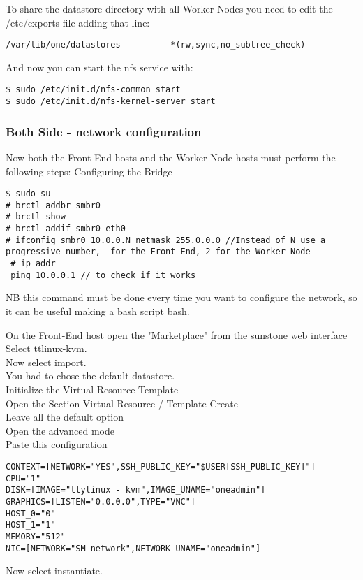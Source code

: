\documentclass[11pt,a4paper]{article}
\begin{document}
To share the datastore directory with all Worker Nodes you need to edit the /etc/exports file adding that line:
\begin{lstlisting}
/var/lib/one/datastores  		 *(rw,sync,no_subtree_check)
\end{lstlisting}

And now you can start the nfs service with:
\begin{lstlisting}
$ sudo /etc/init.d/nfs-common start
$ sudo /etc/init.d/nfs-kernel-server start
\end{lstlisting}

\subsubsection{Both Side - network configuration}
Now both the Front-End hosts and the Worker Node hosts must perform the following steps:
Configuring the Bridge

\begin{lstlisting}
$ sudo su
# brctl addbr smbr0
# brctl show
# brctl addif smbr0 eth0
# ifconfig smbr0 10.0.0.N netmask 255.0.0.0 //Instead of N use a progressive number,  for the Front-End, 2 for the Worker Node
 # ip addr
 ping 10.0.0.1 // to check if it works
\end{lstlisting}

NB this command must be done every time you want to configure the network, so it can be useful making a bash script bash.

On the Front-End host open the "Marketplace" from the sunstone web interface\\
Select ttlinux-kvm.\\
Now select import.\\
You had to chose the default datastore.\\

Initialize the Virtual Resource Template\\
Open the Section Virtual Resource / Template
Create\\
Leave all the default option\\
Open the advanced mode\\
Paste this configuration\\
\begin{lstlisting}
CONTEXT=[NETWORK="YES",SSH_PUBLIC_KEY="$USER[SSH_PUBLIC_KEY]"]
CPU="1"
DISK=[IMAGE="ttylinux - kvm",IMAGE_UNAME="oneadmin"]
GRAPHICS=[LISTEN="0.0.0.0",TYPE="VNC"]
HOST_0="0"
HOST_1="1"
MEMORY="512"
NIC=[NETWORK="SM-network",NETWORK_UNAME="oneadmin"]
\end{lstlisting}
Now select instantiate.
\end{document}
